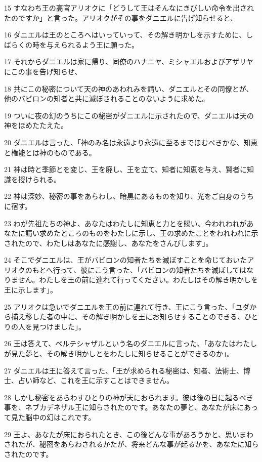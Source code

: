 \par 15 すなわち王の高官アリオクに「どうして王はそんなにきびしい命令を出されたのですか」と言った。アリオクがその事をダニエルに告げ知らせると、
\par 16 ダニエルは王のところへはいっていって、その解き明かしを示すために、しばらくの時を与えられるよう王に願った。
\par 17 それからダニエルは家に帰り、同僚のハナニヤ、ミシャエルおよびアザリヤにこの事を告げ知らせ、
\par 18 共にこの秘密について天の神のあわれみを請い、ダニエルとその同僚とが、他のバビロンの知者と共に滅ぼされることのないように求めた。
\par 19 ついに夜の幻のうちにこの秘密がダニエルに示されたので、ダニエルは天の神をほめたたえた。
\par 20 ダニエルは言った、「神のみ名は永遠より永遠に至るまでほむべきかな、知恵と権能とは神のものである。
\par 21 神は時と季節とを変じ、王を廃し、王を立て、知者に知恵を与え、賢者に知識を授けられる。
\par 22 神は深妙、秘密の事をあらわし、暗黒にあるものを知り、光をご自身のうちに宿す。
\par 23 わが先祖たちの神よ、あなたはわたしに知恵と力とを賜い、今われわれがあなたに請い求めたところのものをわたしに示し、王の求めたことをわれわれに示されたので、わたしはあなたに感謝し、あなたをさんびします」。
\par 24 そこでダニエルは、王がバビロンの知者たちを滅ぼすことを命じておいたアリオクのもとへ行って、彼にこう言った、「バビロンの知者たちを滅ぼしてはなりません。わたしを王の前に連れて行ってください。わたしはその解き明かしを王に示します」。
\par 25 アリオクは急いでダニエルを王の前に連れて行き、王にこう言った、「ユダから捕え移した者の中に、その解き明かしを王にお知らせすることのできる、ひとりの人を見つけました」。
\par 26 王は答えて、ベルテシャザルという名のダニエルに言った、「あなたはわたしが見た夢と、その解き明かしとをわたしに知らせることができるのか」。
\par 27 ダニエルは王に答えて言った、「王が求められる秘密は、知者、法術士、博士、占い師など、これを王に示すことはできません。
\par 28 しかし秘密をあらわすひとりの神が天におられます。彼は後の日に起るべき事を、ネブカデネザル王に知らされたのです。あなたの夢と、あなたが床にあって見た脳中の幻はこれです。
\par 29 王よ、あなたが床におられたとき、この後どんな事があろうかと、思いまわされたが、秘密をあらわされるかたが、将来どんな事が起るかを、あなたに知らされたのです。
